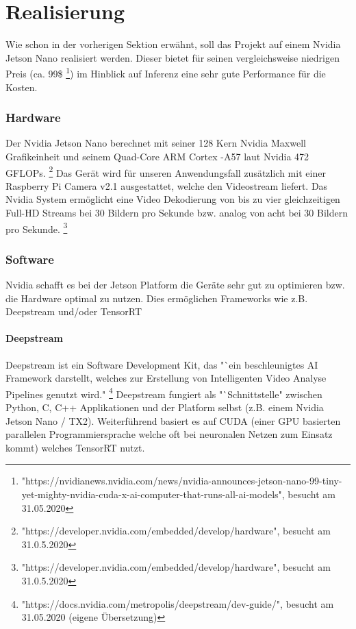 \documentclass[a4paper,oneside,12pt]{report}
\begin{document}
	\chapter*{Realisierung}
	\begin{onehalfspace}
		Wie schon in der vorherigen Sektion erwähnt, soll das Projekt auf einem Nvidia Jetson Nano realisiert werden. Dieser bietet für seinen vergleichsweise niedrigen Preis (ca. 99\$
		\footnote{"https://nvidianews.nvidia.com/news/nvidia-announces-jetson-nano-99-tiny-yet-mighty-nvidia-cuda-x-ai-computer-that-runs-all-ai-models", besucht am 31.05.2020})
		im Hinblick auf Inferenz eine sehr gute Performance für die Kosten.
		\subsection*{Hardware}
		Der Nvidia Jetson Nano berechnet mit seiner 128 Kern Nvidia Maxwell Grafikeinheit und seinem Quad-Core ARM Cortex -A57 laut Nvidia 472 GFLOPs.
		\footnote{"https://developer.nvidia.com/embedded/develop/hardware", besucht am 31.0.5.2020}
		Das Gerät wird für unseren Anwendungsfall zusätzlich mit einer Raspberry Pi Camera v2.1 ausgestattet, welche den Videostream liefert. Das Nvidia System ermöglicht eine Video Dekodierung von bis zu vier gleichzeitigen Full-HD Streams bei 30 Bildern pro Sekunde bzw. analog von acht bei 30 Bildern pro Sekunde.
		\footnote{"https://developer.nvidia.com/embedded/develop/hardware", besucht am 31.0.5.2020}
		\subsection*{Software}
		Nvidia schafft es bei der Jetson Platform die Geräte sehr gut zu optimieren bzw. die Hardware optimal zu nutzen. Dies ermöglichen Frameworks wie z.B. Deepstream und/oder TensorRT
		\subsubsection*{Deepstream}
		Deepstream ist ein Software Development Kit, das "`ein beschleunigtes AI Framework darstellt, welches zur Erstellung von Intelligenten Video Analyse Pipelines genutzt wird."
		\footnote{"https://docs.nvidia.com/metropolis/deepstream/dev-guide/", besucht am 31.05.2020 (eigene Übersetzung)}
		Deepstream fungiert als "`Schnittstelle" zwischen Python, C, C++ Applikationen und der Platform selbst (z.B. einem Nvidia Jetson Nano / TX2).
		Weiterführend basiert es auf CUDA (einer GPU basierten parallelen Programmiersprache welche oft bei neuronalen Netzen zum Einsatz kommt) welches TensorRT nutzt.

\end{onehalfspace}
\end{document}
